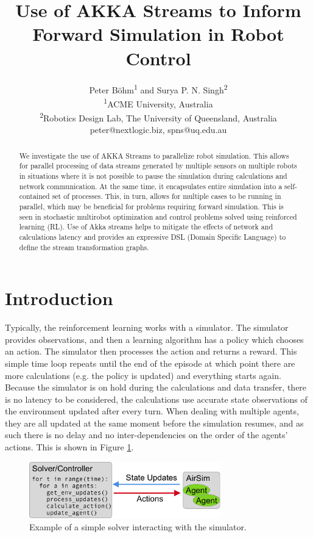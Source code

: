 \documentclass{article}
\title{Use of AKKA Streams to Inform Forward Simulation in Robot Control}
\author{Peter Böhm\textsuperscript{1} and Surya P. N. Singh\textsuperscript{2}\\ \textsuperscript{1}ACME University, Australia\\ 
	\textsuperscript{2}Robotics Design Lab, The University of Queensland, Australia\\
	peter@nextlogic.biz, spns@uq.edu.au}
\begin{document}
\maketitle

\begin{abstract}
We investigate the use of AKKA Streams to parallelize robot simulation. This allows for parallel processing of data streams generated by multiple sensors on multiple robots in situations where it is not possible to pause the simulation during calculations and network communication. At the same time, it encapsulates entire simulation into a self-contained set of processes. This, in turn, allows for multiple cases to be running in parallel, which may be beneficial for problems requiring forward simulation. This is seen in stochastic multirobot optimization and control problems solved using reinforced learning (RL). Use of Akka streams helps to mitigate the effects of network and calculations latency and provides an expressive DSL (Domain Specific Language) to define the stream transformation graphs. 

\end{abstract}

\section{Introduction}
Typically, the reinforcement learning works with a simulator. The simulator provides observations, and then a learning algorithm has a policy which chooses an action. The simulator then processes the action and returns a reward. This simple time loop repeats until the end of the episode at which point there are more calculations (e.g. the policy is updated) and everything starts again. Because the simulator is on hold during the calculations and data transfer, there is no latency to be considered, the calculations use accurate state observations of the environment updated after every turn. When dealing with multiple agents, they are all updated at the same moment before the simulation resumes, and as such there is no delay and no inter-dependencies on the order of the agents' actions. This is shown in Figure \ref{fig:naive-solver}.
\begin{figure}
	\centering
	\includegraphics[width=8.31cm]{naive-solver}
	\caption{Example of a simple solver interacting with the simulator.}\label{fig:naive-solver}
\end{figure}
\end{document}
